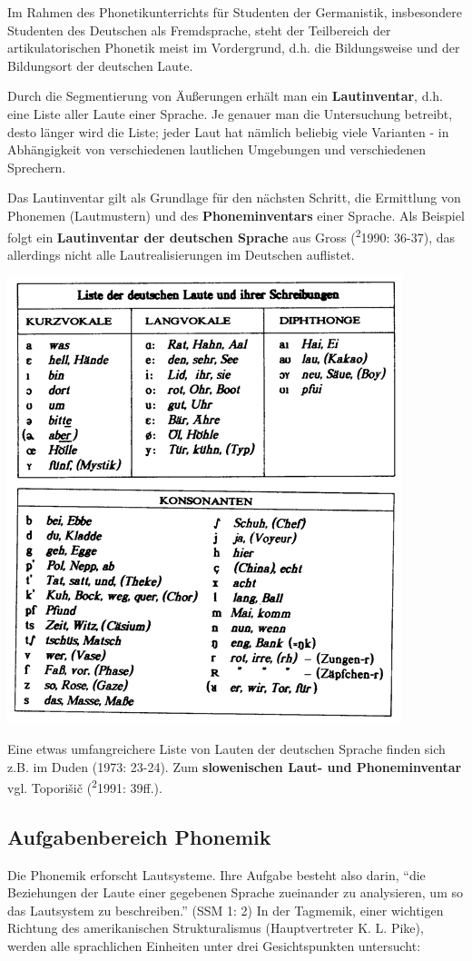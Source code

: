 \documentclass[
]{article}
\begin{document}
Im Rahmen des Phonetikunterrichts für Studenten der Germanistik,
insbesondere Studenten des Deutschen als Fremdsprache, steht der
Teilbereich der artikulatorischen Phonetik meist im Vordergrund, d.h.
die Bildungsweise und der Bildungsort der deutschen Laute.

Durch die Segmentierung von Äußerungen erhält man ein \textbf{Lautinventar},
d.h. eine Liste aller Laute einer Sprache. Je genauer man die
Untersuchung betreibt, desto länger wird die Liste; jeder Laut hat
nämlich beliebig viele Varianten - in Abhängigkeit von verschiedenen
lautlichen Umgebungen und verschiedenen Sprechern.

Das Lautinventar gilt als Grundlage für den nächsten Schritt, die
Ermittlung von Phonemen (Lautmustern) und des \textbf{Phoneminventars} einer
Sprache. Als Beispiel folgt ein \textbf{Lautinventar der deutschen Sprache}
aus Gross (\textsuperscript{2}1990: 36-37), das allerdings nicht alle Lautrealisierungen
im Deutschen auflistet.

\includegraphics[width=0.6\linewidth]{pictures/01b_NSG_Intro_2020-10-07/deutsche_phone}

Eine etwas umfangreichere Liste von Lauten der deutschen Sprache finden
sich z.B. im Duden (1973: 23-24). Zum \textbf{slowenischen Laut- und
Phoneminventar} vgl. Toporišič (\textsuperscript{2}1991: 39ff.).

\hypertarget{aufgabenbereich-phonemik}{%
\subsection{Aufgabenbereich Phonemik}\label{aufgabenbereich-phonemik}}

Die Phonemik erforscht Lautsysteme. Ihre Aufgabe besteht also darin,
``die Beziehungen der Laute einer gegebenen Sprache zueinander zu
analysieren, um so das Lautsystem zu beschreiben.'' (SSM 1: 2) In der
Tagmemik, einer wichtigen Richtung des amerikanischen Strukturalismus
(Hauptvertreter K. L. Pike), werden alle sprachlichen Einheiten unter
drei Gesichtspunkten untersucht:
\end{document}
